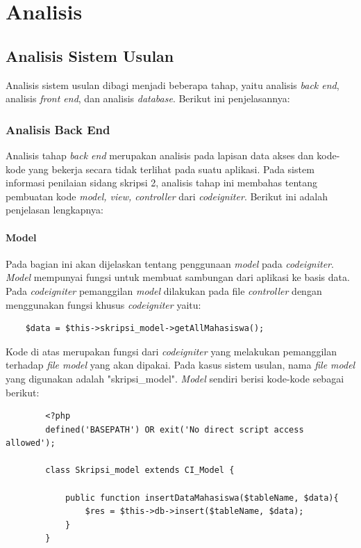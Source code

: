 \chapter{Analisis}
\label{chap: analisis}
	
\section{Analisis Sistem Usulan}
\label{sec: analisisKode}

Analisis sistem usulan dibagi menjadi beberapa tahap, yaitu analisis \textit{back end}, analisis \textit{front end}, dan analisis \textit{database}. Berikut ini penjelasannya:
	
	\subsection{Analisis Back End}
	\label{sub: backEnd}
	
	Analisis tahap \textit{back end} merupakan analisis pada lapisan data akses dan kode-kode yang bekerja secara tidak terlihat pada suatu aplikasi. Pada sistem informasi penilaian sidang skripsi 2, analisis tahap ini membahas tentang pembuatan kode \textit{model, view, controller} dari \textit{codeigniter}. Berikut ini adalah penjelasan lengkapnya:
	
	\subsubsection{Model}
	\label{subsub: modelCI}
	
	Pada bagian ini akan dijelaskan tentang penggunaan \textit{model} pada \textit{codeigniter}. \textit{Model} mempunyai fungsi untuk membuat sambungan dari aplikasi ke basis data. Pada \textit{codeigniter} pemanggilan \textit{model} dilakukan pada file \textit{controller} dengan menggunakan fungsi khusus \textit{codeigniter} yaitu:
	\begin{lstlisting}
	$data = $this->skripsi_model->getAllMahasiswa();
	\end{lstlisting}
	
	Kode di atas merupakan fungsi dari \textit{codeigniter} yang melakukan pemanggilan terhadap \textit{file model} yang akan dipakai. Pada kasus sistem usulan, nama \textit{file model} yang digunakan adalah "skripsi\_model". \textit{Model} sendiri berisi kode-kode sebagai berikut:
	\begin{lstlisting}
		<?php
		defined('BASEPATH') OR exit('No direct script access allowed');
		
		class Skripsi_model extends CI_Model {
		
			public function insertDataMahasiswa($tableName, $data){
				$res = $this->db->insert($tableName, $data);
			}
		}
	\end{lstlisting}
	
